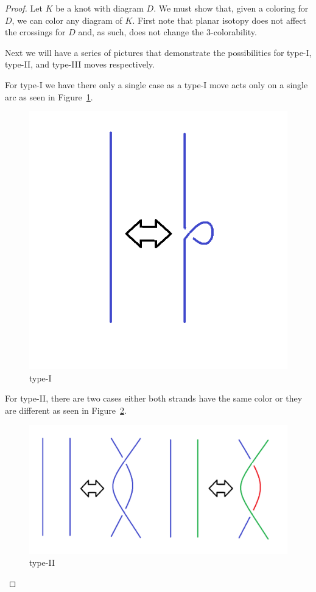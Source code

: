 \documentclass[12pt]{amsart}
\theoremstyle{definition}
\theoremstyle{remark}
\numberwithin{equation}{section}
\newcommand{\ds}{.3}
\begin{document}
\begin{proof}
  Let $K$ be a knot with diagram $D$. We must show that, given a coloring
  for $D$, we can color any diagram of $K$. First note that planar isotopy
  does not affect the crossings for $D$ and, as such, does not change the
  $3$-colorability.

  Next we will have a series of pictures that demonstrate the possibilities
  for type-I, type-II, and type-III moves respectively.

  For type-I we have there only a single case as a type-I move acts only on
  a single arc as seen in Figure~\ref{fig:t1-c}.
  \begin{figure}
    \includegraphics[scale=\ds]{t1-c}
    \caption{type-I}
    \label{fig:t1-c}
  \end{figure}
  
  For type-II, there are two cases either both strands have the same color
  or they are different as seen in Figure~\ref{fig:t2-c}.
  \begin{figure}
    \includegraphics[scale=\ds]{t2-c}
    \caption{type-II}
    \label{fig:t2-c}
  \end{figure}


\end{proof}
\end{document}
